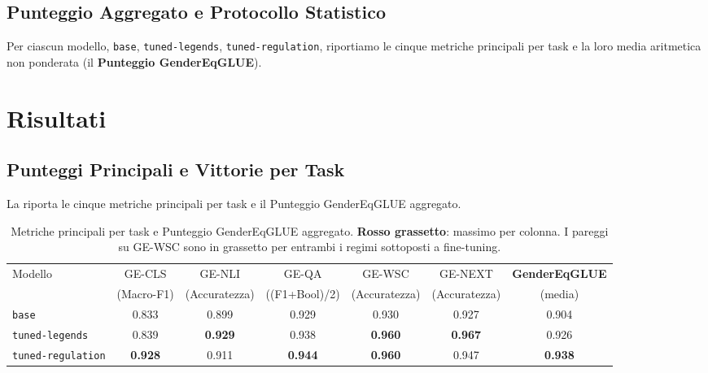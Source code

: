 \documentclass[pdflatex, sn-apa]{sn-jnl}%
\theoremstyle{thmstyleone}%
\theoremstyle{thmstyletwo}%
\theoremstyle{thmstylethree}%
\newcommand{\best}[1]{\textcolor{bestred}{\textbf{#1}}}
\newcommand{\modelbase}{\texttt{base}}
\newcommand{\modellegends}{\texttt{tuned-legends}}
\newcommand{\modelreg}{\texttt{tuned-regulation}}
\begin{document}
\subsection{Punteggio Aggregato e Protocollo Statistico}
\label{sec:bench:protocol}

Per ciascun modello, \modelbase, \modellegends, \modelreg{}, riportiamo le cinque
metriche principali per task e la loro media aritmetica non ponderata (il
\textbf{Punteggio GenderEqGLUE}).

\FloatBarrier

\section{Risultati}
\label{sec:results}

\subsection{Punteggi Principali e Vittorie per Task}
\label{sec:results:headline}

La  riporta le cinque metriche principali per task e il
Punteggio GenderEqGLUE aggregato.

\begin{table}[h]
\centering
\caption{Metriche principali per task e Punteggio GenderEqGLUE aggregato.
\best{Rosso grassetto}: massimo per colonna. I pareggi su GE-WSC sono in
grassetto per entrambi i regimi sottoposti a fine-tuning.}
\label{tab:headline}
\small
\begin{tabular}{@{}lcccccc@{}}
\toprule
Modello          & GE-CLS         & GE-NLI         & GE-QA          & GE-WSC
& GE-NEXT        & \textbf{GenderEqGLUE} \\
                 & (Macro-F1)     & (Accuratezza)  & ((F1+Bool)/2)  & (Accuratezza)
                 & (Accuratezza)  & (media)               \\
\midrule
\modelbase       & 0.833          & 0.899          & 0.929          & 0.930
& 0.927          & 0.904                 \\
\modellegends    & 0.839          & \best{0.929}   & 0.938          &
\best{0.960}   & \best{0.967}   & 0.926                 \\
\modelreg        & \best{0.928}   & 0.911          & \best{0.944}   &
\best{0.960}   & 0.947          & \best{0.938}          \\
\bottomrule
\end{tabular}
\end{table}
\end{document}
